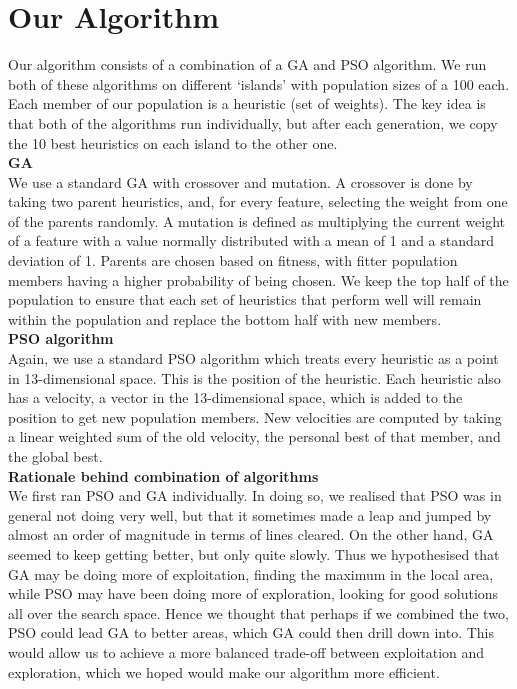 \documentclass[12pt]{article}
\begin{document}
    \section{Our Algorithm}

    Our algorithm consists of a combination of a GA and PSO algorithm. We run both of these algorithms on different ‘islands’
	with population sizes of a 100 each. Each member of our population is a heuristic (set of weights).
	The key idea is that both of the algorithms run individually, but after each generation, we
	copy the 10 best heuristics on each island to the other one.\\

	\textbf{GA}\\
	We use a standard GA with crossover and mutation. A crossover is
	done by taking two parent heuristics, and,
	for every feature, selecting the weight from one of the parents randomly. A
	mutation is defined as multiplying the current weight of a feature with
	a value normally distributed with a mean of 1 and a standard deviation of 1. Parents are chosen based on fitness, with fitter population members having a higher
	probability of being chosen. We keep the top half of the population to ensure that each set of heuristics
	that perform well will remain within the population and replace the bottom half with
	new members.\\

	\textbf{PSO algorithm}\\
	Again, we use a standard PSO algorithm which treats every heuristic as a point in 13-dimensional space.
	This is the position of the heuristic. Each heuristic also has a velocity,
	a vector in the 13-dimensional space, which is added to the position to get
	new population members. New velocities are computed by taking a linear weighted
	sum of the old velocity, the personal best of that member, and the global best.\\

	\textbf{Rationale behind combination of algorithms}\\
	We first ran PSO and GA individually. In doing so, we realised that PSO was in general not doing
	very well, but that it sometimes made a leap and jumped by almost an order of magnitude
	in terms of lines cleared. On the other hand, GA seemed to keep getting
	better, but only quite slowly. Thus we hypothesised
	that GA may be doing more of exploitation, finding the maximum in the local area,
	while PSO may have been doing more of exploration, looking for good solutions all over
	the search space. Hence we thought that perhaps if we combined the two,
	PSO could lead GA to better areas, which GA could then drill down into.
	This would allow us to achieve a more balanced trade-off between exploitation
	and exploration, which we hoped would make our algorithm more efficient.
\end{document}
